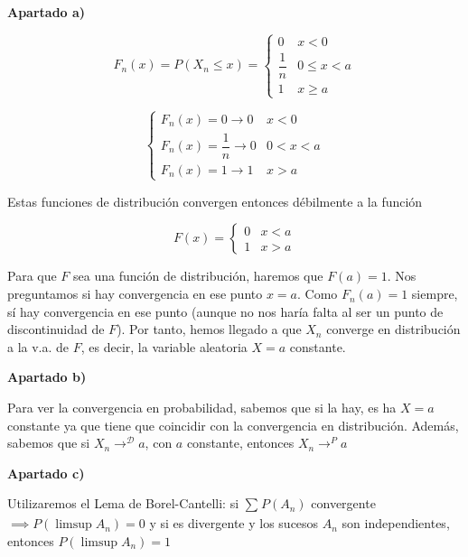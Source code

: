 \documentclass[openany]{book}
\begin{document}
\begin{exercise}$  $
  \begin{flushright}
    \textbf{Apartado a)}
  \end{flushright}

  $$ F_n(x) = P(X_n\leq x) = \left\{
  \begin{array}{ll}
    0 & x<0\\ 
    \dfrac{1}{n} & 0\leq  x < a\\ 
    1 & x\geq a
  \end{array}
  \right. $$

  $$ \left\{
  \begin{array}{ll}
    F_n(x) = 0 \to 0 & x<0 \\ 
    F_n(x) = \dfrac{1}{n} \to 0 & 0<x<a \\ 
    F_n(x) = 1 \to 1 & x>a
  \end{array}
  \right. $$

  Estas funciones de distribución convergen entonces débilmente a la función

  $$ F(x) = \left\{
  \begin{array}{ll}
    0 & x<a \\ 
    1 & x>a
  \end{array}
  \right. $$
  
  Para que $ F $ sea una función de distribución, haremos que $ F(a) = 1 $. Nos preguntamos si hay convergencia en ese punto $ x=a $. Como $ F_n(a) = 1 $ siempre, sí hay convergencia en ese punto (aunque no nos haría falta al ser un punto de discontinuidad de $ F $). Por tanto, hemos llegado a que $ X_n $ converge en distribución a la v.a. de $ F $, es decir, la variable aleatoria $ X=a $ constante.


  \begin{flushright}
    \textbf{Apartado b)}
  \end{flushright}
  
  Para ver la convergencia en probabilidad, sabemos que si la hay, es ha $ X=a $ constante ya que tiene que coincidir con la convergencia en distribución. Además, sabemos que si $ X_n \to^{\mathcal{D}} a $, con $ a $ constante, entonces $ X_n \to^{P} a $

\begin{flushright}
    \textbf{Apartado c)}
\end{flushright}

Utilizaremos el Lema de Borel-Cantelli: si $ \sum\limits_{}^{}P(A_n) $ convergente $ \implies P(\limsup A_n) = 0 $ y si es divergente y los sucesos $ A_n $ son independientes, entonces $ P(\limsup A_n) = 1 $


\end{exercise}
\end{document}
